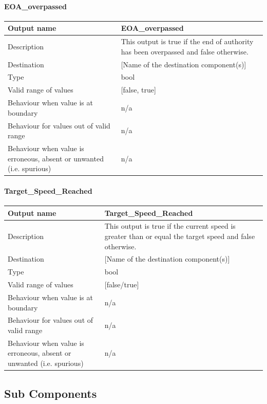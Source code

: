 \paragraph{EOA\_overpassed}

\begin{longtable}{p{}p{}}
\toprule
Output name				& EOA\_overpassed \\
\midrule
Description				& This output is true if the end of authority has been overpassed and false otherwise. \\
\midrule
Destination				& [Name of the destination component(s)] \\ 
\midrule
Type					& bool \\
\midrule
Valid range of values	& [false, true] \\
\midrule
Behaviour when value is at boundary	& n/a \\
\midrule
Behaviour for values out of valid range	& n/a \\
\midrule
Behaviour when value is erroneous, absent or unwanted (i.e. spurious) & n/a \\
\bottomrule
\end{longtable}


\paragraph{Target\_Speed\_Reached}

\begin{longtable}{p{}p{}}
\toprule
Output name				& Target\_Speed\_Reached \\
\midrule
Description				& This output is true if the current speed is greater than or equal the target speed and false otherwise. \\
\midrule
Destination				& [Name of the destination component(s)] \\ 
\midrule
Type					& bool \\
\midrule
Valid range of values	& [false/true] \\
\midrule
Behaviour when value is at boundary	& n/a \\
\midrule
Behaviour for values out of valid range	& n/a \\
\midrule
Behaviour when value is erroneous, absent or unwanted (i.e. spurious) & n/a \\
\bottomrule
\end{longtable}


\subsection{Sub Components}\label{s:SDM_subcomponents}

